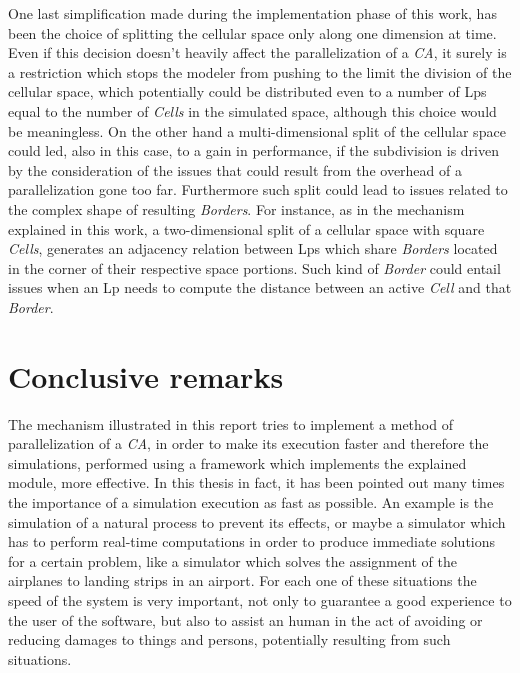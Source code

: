 \documentclass[12pt,a4paper,fleqn]{report}
\begin{document}
 One last simplification made during the implementation phase of this work, has been the choice of splitting the cellular space only along one dimension at time. Even if this decision doesn't heavily affect the parallelization of a \textit{CA}, it surely is a restriction which stops the modeler from pushing to the limit the division of the cellular space, which potentially could be distributed even to a number of Lps equal to the number of \textit{Cells} in the simulated space, although this choice would be meaningless. On the other hand a multi-dimensional split of the cellular space could led, also in this case, to a gain in performance, if the subdivision is driven by the consideration of the issues that could result from the overhead of a parallelization gone too far. Furthermore such split could lead to issues related to the complex shape of resulting \textit{Borders}. For instance, as in the mechanism explained in this work, a two-dimensional split of a cellular space with square \textit{Cells}, generates an adjacency relation between Lps which share \textit{Borders} located in the corner of their respective space portions. Such kind of \textit{Border} could entail issues when an Lp needs to compute the distance between an active \textit{Cell} and that \textit{Border}.
 \section{Conclusive remarks}
 The mechanism illustrated in this report tries to implement a method of parallelization of a \textit{CA}, in order to make its execution faster and therefore the simulations, performed using a framework which implements the explained module, more effective. In this thesis in fact, it has been pointed out many times the importance of a simulation execution as fast as possible. An example is the simulation of a natural process to prevent its effects, or maybe a simulator which has to perform real-time computations in order to produce immediate solutions for a certain problem, like a simulator which solves the assignment of the airplanes to landing strips in an airport. For each one of these situations the speed of the system is very important, not only to guarantee a good experience to the user of the software, but also to assist an human in the act of avoiding or reducing damages to things and persons, potentially resulting from such situations.
\nocite{0}
\nocite{1}
\nocite{2}
\nocite{3}
\nocite{4}
\printbibliography{}
\end{document}
